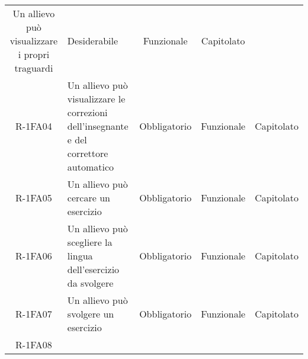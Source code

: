 \begin{tabularx}{\textwidth}{cXccc}


Un allievo può visualizzare i propri traguardi &

Desiderabile &

Funzionale &

Capitolato \\
R-1FA04 &



Un allievo può visualizzare le correzioni dell’insegnante e del correttore automatico &

Obbligatorio &

Funzionale &

Capitolato \\
R-1FA05 &




Un allievo può cercare un esercizio &

Obbligatorio &

Funzionale &

Capitolato \\
R-1FA06 &

Un allievo può scegliere la lingua dell’esercizio da svolgere &

Obbligatorio &

Funzionale &

Capitolato \\
R-1FA07 &


Un allievo può svolgere un esercizio &

Obbligatorio &

Funzionale &

Capitolato \\
R-1FA08 &


\end{tabularx}
